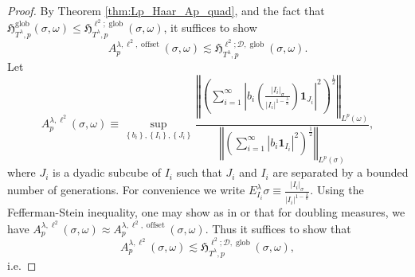 \documentclass{amsart}%
\theoremstyle{plain}
\numberwithin{equation}{section}
\begin{document}
\begin{proof}
By Theorem \ref{thm:Lp_Haar_Ap_quad}, and the fact that $\mathfrak{H}%
_{T^{\lambda},p}^{\operatorname*{glob}}\left(  \sigma,\omega\right)
\leq\mathfrak{H}_{T^{\lambda},p}^{\ell^{2};\operatorname*{glob}}\left(
\sigma,\omega\right)  $, it suffices to show
\[
A_{p}^{\lambda,\ell^{2},\operatorname{offset}}\left(  \sigma,\omega\right)
\lesssim\mathfrak{H}_{T^{\lambda},p}^{\ell^{2};\mathcal{D}%
,\operatorname*{glob}}\left(  \sigma,\omega\right)  .
\]
Let%
\[
A_{p}^{\lambda,\ell^{2}}\left(  \sigma,\omega\right)  \equiv\sup_{\left\{
b_{i}\right\}  ,\left\{  I_{i}\right\}  ,\left\{  J_{i}\right\}  }%
\frac{\left\Vert \left(  \sum_{i=1}^{\infty}\left\vert b_{i}\left(
\frac{\left\vert I_{i}\right\vert _{\sigma}}{\left\vert I_{i}\right\vert
^{1-\frac{\lambda}{n}}}\right)  \mathbf{1}_{J_{i}}\right\vert ^{2}\right)
^{\frac{1}{2}}\right\Vert _{L^{p}\left(  \omega\right)  }}{\left\Vert \left(
\sum_{i=1}^{\infty}\left\vert b_{i}\mathbf{1}_{I_{i}}\right\vert ^{2}\right)
^{\frac{1}{2}}\right\Vert _{L^{p}\left(  \sigma\right)  }},
\]
where $J_{i}$ is a dyadic subcube of $I_{i}$ such that $J_{i}$ and $I_{i}$ are
separated by a bounded number of generations. For convenience we write
$E_{I_{i}}^{\lambda}\sigma\equiv\frac{\left\vert I_{i}\right\vert _{\sigma}%
}{\left\vert I_{i}\right\vert ^{1-\frac{\lambda}{n}}}$. Using the
Fefferman-Stein inequality, one may show as in \cite[page 4]{SaWi} or
\cite[page 8]{AlLuSaUr3} that for doubling measures, we have $A_{p}%
^{\lambda,\ell^{2}}\left(  \sigma,\omega\right)  \approx A_{p}^{\lambda
,\ell^{2},\operatorname{offset}}\left(  \sigma,\omega\right)  $. Thus it
suffices to show that
\[
A_{p}^{\lambda,\ell^{2}}\left(  \sigma,\omega\right)  \lesssim\mathfrak{H}%
_{T^{\lambda},p}^{\ell^{2};\mathcal{D},\operatorname*{glob}}\left(
\sigma,\omega\right)  ,
\]
i.e.%


\end{proof}
\end{document}
